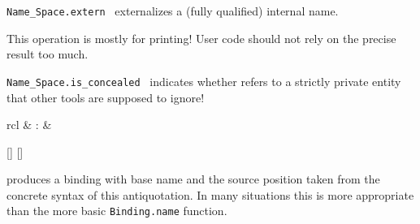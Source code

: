 \begin{isabellebody}
\begin{isamarkuptext}
\begin{description}
  \item \verb|Name_Space.extern|~ externalizes a
  (fully qualified) internal name.

  This operation is mostly for printing!  User code should not rely on
  the precise result too much.

  \item \verb|Name_Space.is_concealed|~ indicates
  whether  refers to a strictly private entity that
  other tools are supposed to ignore!

  \end{description}%
\end{isamarkuptext}%
\isamarkuptrue%
%
\endisatagmlref
{\isafoldmlref}%
%
\isadelimmlref
%
\endisadelimmlref
%
\isadelimmlantiq
%
\endisadelimmlantiq
%
\isatagmlantiq
%
\begin{isamarkuptext}%
\begin{matharray}{rcl}
  \hypertarget{ML antiquotation.binding}{\hyperlink{ML antiquotation.binding}{\mbox{}}} & : &  \\
  \end{matharray}

  \begin{railoutput}
[]
[]
\rail@end
\end{railoutput}


  \begin{description}

  \item {} produces a binding with base name
   and the source position taken from the concrete
  syntax of this antiquotation.  In many situations this is more
  appropriate than the more basic \verb|Binding.name| function.


\end{description}
\end{isamarkuptext}
\end{isabellebody}
